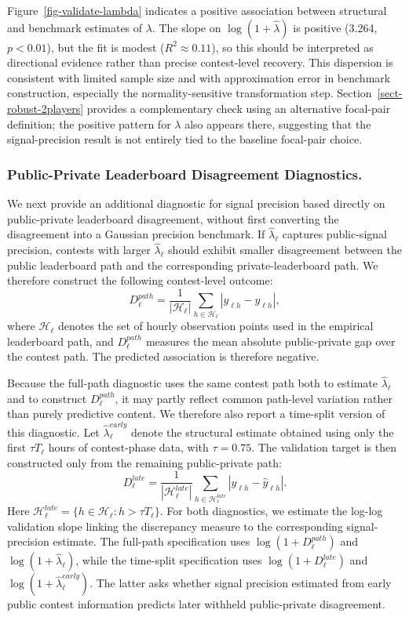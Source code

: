 \documentclass[mnsc]{informs3}
\begin{document}
Figure~\ref{fig-validate-lambda} indicates a positive association between structural and benchmark estimates of $\lambda$.
The slope on $\log(1+\hat\lambda)$ is positive (3.264, $p<0.01$), but the fit is modest ($R^2\approx0.11$), so this should be interpreted as directional evidence rather than precise contest-level recovery.
This dispersion is consistent with limited sample size and with approximation error in benchmark construction, especially the normality-sensitive transformation step.
Section~\ref{sect-robust-2players} provides a complementary check using an alternative focal-pair definition; the positive pattern for $\lambda$ also appears there, suggesting that the signal-precision result is not entirely tied to the baseline focal-pair choice.


\subsubsection{Public-Private Leaderboard Disagreement Diagnostics.}
We next provide an additional diagnostic for signal precision based directly on public-private leaderboard disagreement, without first converting the disagreement into a Gaussian precision benchmark.
If $\hat\lambda_\ell$ captures public-signal precision, contests with larger $\hat\lambda_\ell$ should exhibit smaller disagreement between the public leaderboard path and the corresponding private-leaderboard path.
We therefore construct the following contest-level outcome:
\[
D_\ell^{path}
=
\frac{1}{|\mathcal H_\ell|}
\sum_{h\in\mathcal H_\ell}
\left|y_{\ell h}-\hat y_{\ell h}\right|,
\]
where $\mathcal H_\ell$ denotes the set of hourly observation points used in the empirical leaderboard path, and $D_\ell^{path}$ measures the mean absolute public-private gap over the contest path.
The predicted association is therefore negative.

Because the full-path diagnostic uses the same contest path both to estimate $\hat\lambda_\ell$ and to construct $D_\ell^{path}$, it may partly reflect common path-level variation rather than purely predictive content.
We therefore also report a time-split version of this diagnostic.
Let $\hat\lambda_\ell^{early}$ denote the structural estimate obtained using only the first $\tau T_\ell$ hours of contest-phase data, with $\tau=0.75$.
The validation target is then constructed only from the remaining public-private path:
\[
D_\ell^{late}
=
\frac{1}{|\mathcal H_\ell^{late}|}
\sum_{h\in\mathcal H_\ell^{late}}
\left|y_{\ell h}-\hat y_{\ell h}\right|.
\]
Here $\mathcal H_\ell^{late}=\{h\in\mathcal H_\ell:h>\tau T_\ell\}$.
For both diagnostics, we estimate the log-log validation slope linking the discrepancy measure to the corresponding signal-precision estimate.
The full-path specification uses $\log(1+D_\ell^{path})$ and $\log(1+\hat\lambda_\ell)$, while the time-split specification uses $\log(1+D_\ell^{late})$ and $\log(1+\hat\lambda_\ell^{early})$.
The latter asks whether signal precision estimated from early public contest information predicts later withheld public-private disagreement.
\end{document}
